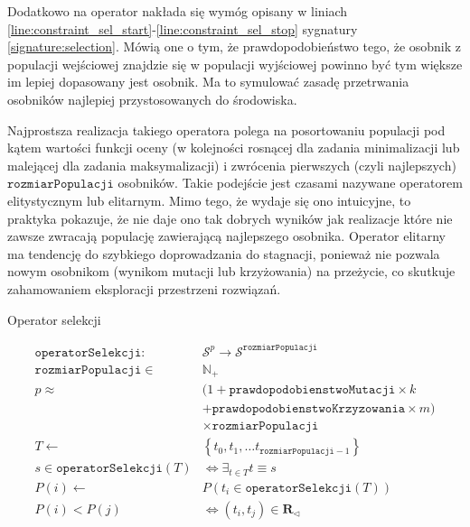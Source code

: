 \documentclass[twoside]{iisthesis}
\newcommand{\numberSet}{\mathbb}
\newcommand{\important}{\mathcal}
\newcommand{\R}{\mathbf{R}}
\newcommand{\minoritySpecimenRel}{{\R}_{\lhd}}
\newcommand{\param}{\mathtt}
\begin{document}
Dodatkowo na operator nakłada się wymóg opisany w liniach \ref{line:constraint_sel_start}-\ref{line:constraint_sel_stop} sygnatury \ref{signature:selection}. Mówią one o tym, że prawdopodobieństwo tego, że osobnik z populacji wejściowej znajdzie się w populacji wyjściowej powinno być tym większe im lepiej dopasowany jest osobnik. Ma to symulować zasadę przetrwania osobników najlepiej przystosowanych do środowiska.

Najprostsza realizacja takiego operatora polega na posortowaniu populacji pod kątem wartości funkcji oceny (w kolejności rosnącej dla zadania minimalizacji lub malejącej dla zadania maksymalizacji) i zwrócenia pierwszych (czyli najlepszych) $\param{rozmiarPopulacji}$ osobników. Takie podejście jest czasami nazywane operatorem elitystycznym lub elitarnym. Mimo tego, że wydaje się ono intuicyjne, to praktyka pokazuje, że nie daje ono tak dobrych wyników jak realizacje które nie zawsze zwracają populację zawierającą najlepszego osobnika. Operator elitarny ma tendencję do szybkiego doprowadzania do stagnacji, ponieważ nie pozwala nowym osobnikom (wynikom mutacji lub krzyżowania) na przeżycie, co skutkuje zahamowaniem eksploracji przestrzeni rozwiązań.

\begin{signature}
	\caption{Operator selekcji \label{signature:selection}}
	\begin{align}
	\param{operatorSelekcji}: &\important{S}^p \rightarrow \important{S}^{\param{rozmiarPopulacji}} \\
	\param{rozmiarPopulacji} \in &\numberSet{N}_{+} \\
	\label{line:p_start} 
	p \approx &(1 + \param{prawdopodobienstwoMutacji} \times k \\
	          &+ \param{prawdopodobienstwoKrzyzowania} \times m) \\
	\label{line:p_stop} 
	&\times \param{rozmiarPopulacji} \\
	\label{line:constraint_sel_start}          
	T \gets &\left\{ t_0, t_1, \ldots t_{\param{rozmiarPopulacji}-1} \right\} \\
	s \in \param{operatorSelekcji}(T) &\Leftrightarrow \exists_{t \in T}  t \equiv s \\
	P(i) \gets &P(t_i \in \param{operatorSelekcji}(T)) \\
	\label{line:constraint_sel_stop} 
	P(i) < P(j) &\Leftrightarrow (t_i, t_j) \in \minoritySpecimenRel
	\end{align}
\end{signature}
\end{document}
